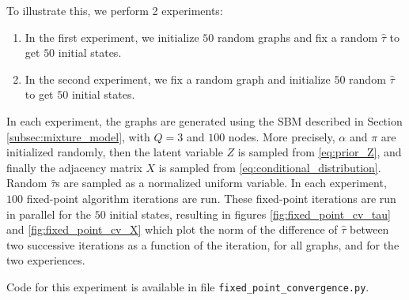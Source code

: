 \documentclass[switch, 12pt]{article}
\begin{document}
\begin{multicols}{2}
    To illustrate this, we perform 2 experiments:
    \begin{enumerate}
        \item In the first experiment, we initialize $50$ random graphs and fix a random $\hat{\tau}$ to get $50$ initial states.
        \item In the second experiment, we fix a random graph and initialize $50$ random $\hat{\tau}$ to get $50$ initial states.
    \end{enumerate}
    In each experiment, the graphs are generated using the SBM described in Section \ref{subsec:mixture_model}, with $Q=3$ and $100$ nodes. More precisely, $\alpha$ and $\pi$ are initialized randomly, then the latent variable $Z$ is sampled from \eqref{eq:prior_Z}, and finally the adjacency matrix $X$ is sampled from \eqref{eq:conditional_distribution}. Random $\hat{\tau}$s are sampled as a normalized uniform variable.
    In each experiment, $100$ fixed-point algorithm iterations are run. These fixed-point iterations are run in parallel for the $50$ initial states, resulting in figures \ref{fig:fixed_point_cv_tau} and \ref{fig:fixed_point_cv_X} which plot the norm of the difference of $\hat{\tau}$ between two successive iterations as a function of the iteration, for all graphs, and for the two experiences.

    Code for this experiment is available in file \texttt{fixed\_point\_convergence.py}.



\end{multicols}
\end{document}
